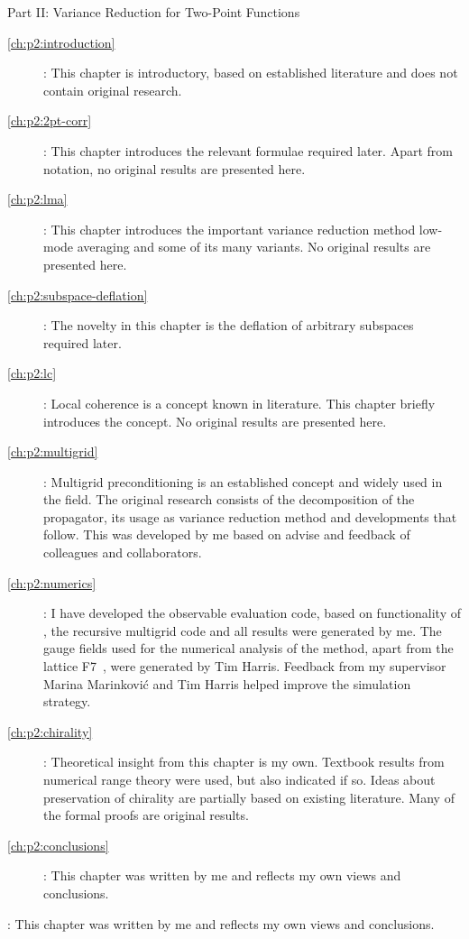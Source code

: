 \begin{description}
\item Part II: Variance Reduction for Two-Point Functions
   \begin{description}
   \item[\cref{ch:p2:introduction}]: This chapter is introductory, based on established literature and does not contain original research.
   \item[\cref{ch:p2:2pt-corr}]: This chapter introduces the relevant formulae required later. Apart from notation, no original results are presented here.
   \item[\cref{ch:p2:lma}]: This chapter introduces the important variance reduction method low-mode averaging and some of its many variants. No original results are presented here.
   \item[\cref{ch:p2:subspace-deflation}]: The novelty in this chapter is the deflation of arbitrary subspaces required later.
   \item[\cref{ch:p2:lc}]: Local coherence is a concept known in literature. This chapter briefly introduces the concept. No original results are presented here.
   \item[\cref{ch:p2:multigrid}]: Multigrid preconditioning is an established concept and widely used in the field. The original research consists of the decomposition of the propagator, its usage as variance reduction method and developments that follow. This was developed by me based on advise and feedback of colleagues and collaborators.
   \item[\cref{ch:p2:numerics}]: I have developed the observable evaluation code, based on functionality of \openqxd, the recursive multigrid code and all results were generated by me. The gauge fields used for the numerical analysis of the method, apart from the lattice F7~\cite{online:cls}, were generated by Tim Harris. Feedback from my supervisor Marina Marinković and Tim Harris helped improve the simulation strategy.
   \item[\cref{ch:p2:chirality}]: Theoretical insight from this chapter is my own. Textbook results from numerical range theory were used, but also indicated if so. Ideas about preservation of chirality are partially based on existing literature. Many of the formal proofs are original results.
   \item[\cref{ch:p2:conclusions}]: This chapter was written by me and reflects my own views and conclusions.
   \end{description}
\item[\cref{ch:summary}]: This chapter was written by me and reflects my own views and conclusions.
\end{description}


